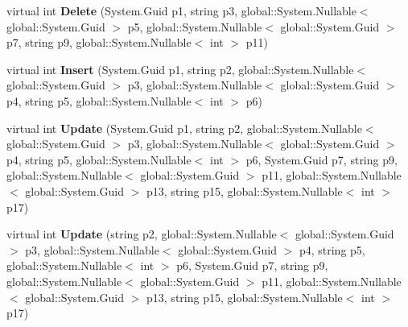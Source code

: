 \begin{DoxyCompactItemize}
\item 
virtual int {\bfseries Delete} (System.\+Guid p1, string p3, global\+::\+System.\+Nullable$<$ global\+::\+System.\+Guid $>$ p5, global\+::\+System.\+Nullable$<$ global\+::\+System.\+Guid $>$ p7, string p9, global\+::\+System.\+Nullable$<$ int $>$ p11)\hypertarget{class_products_1_1_data_1_1ds_sage_table_adapters_1_1ta_maschinenserie_a178a7aa77891f26422cde35191606a54}{}\label{class_products_1_1_data_1_1ds_sage_table_adapters_1_1ta_maschinenserie_a178a7aa77891f26422cde35191606a54}

\item 
virtual int {\bfseries Insert} (System.\+Guid p1, string p2, global\+::\+System.\+Nullable$<$ global\+::\+System.\+Guid $>$ p3, global\+::\+System.\+Nullable$<$ global\+::\+System.\+Guid $>$ p4, string p5, global\+::\+System.\+Nullable$<$ int $>$ p6)\hypertarget{class_products_1_1_data_1_1ds_sage_table_adapters_1_1ta_maschinenserie_a493d52b3279c37f0f7f2eb7174d3eb0d}{}\label{class_products_1_1_data_1_1ds_sage_table_adapters_1_1ta_maschinenserie_a493d52b3279c37f0f7f2eb7174d3eb0d}

\item 
virtual int {\bfseries Update} (System.\+Guid p1, string p2, global\+::\+System.\+Nullable$<$ global\+::\+System.\+Guid $>$ p3, global\+::\+System.\+Nullable$<$ global\+::\+System.\+Guid $>$ p4, string p5, global\+::\+System.\+Nullable$<$ int $>$ p6, System.\+Guid p7, string p9, global\+::\+System.\+Nullable$<$ global\+::\+System.\+Guid $>$ p11, global\+::\+System.\+Nullable$<$ global\+::\+System.\+Guid $>$ p13, string p15, global\+::\+System.\+Nullable$<$ int $>$ p17)\hypertarget{class_products_1_1_data_1_1ds_sage_table_adapters_1_1ta_maschinenserie_ae7f5296028197b2bddb5fed312f4b7cd}{}\label{class_products_1_1_data_1_1ds_sage_table_adapters_1_1ta_maschinenserie_ae7f5296028197b2bddb5fed312f4b7cd}

\item 
virtual int {\bfseries Update} (string p2, global\+::\+System.\+Nullable$<$ global\+::\+System.\+Guid $>$ p3, global\+::\+System.\+Nullable$<$ global\+::\+System.\+Guid $>$ p4, string p5, global\+::\+System.\+Nullable$<$ int $>$ p6, System.\+Guid p7, string p9, global\+::\+System.\+Nullable$<$ global\+::\+System.\+Guid $>$ p11, global\+::\+System.\+Nullable$<$ global\+::\+System.\+Guid $>$ p13, string p15, global\+::\+System.\+Nullable$<$ int $>$ p17)\hypertarget{class_products_1_1_data_1_1ds_sage_table_adapters_1_1ta_maschinenserie_a4265c7827ac65a1ff73cf80488bf2082}{}\label{class_products_1_1_data_1_1ds_sage_table_adapters_1_1ta_maschinenserie_a4265c7827ac65a1ff73cf80488bf2082}

\end{DoxyCompactItemize}
